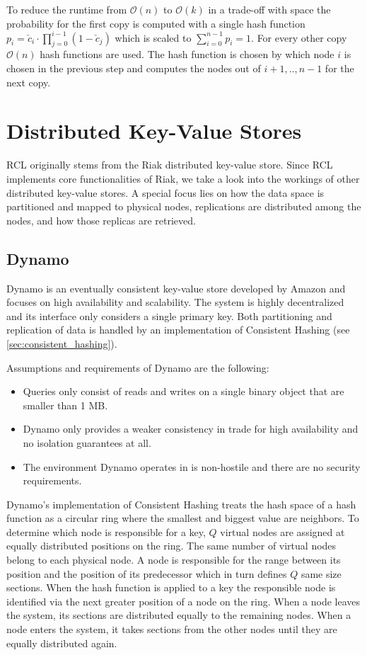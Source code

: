 To reduce the runtime from $\mathcal{O}(n)$ to $\mathcal{O}(k)$  in a trade-off with space the probability for the first copy is computed with a single hash function $p_i = \check c_i\cdot\prod\limits_{j=0}^{i-1}(1-\check c_j)$ which is scaled to $\sum\limits_{i=0}^{n-1}p_i = 1$.
For every other copy $\mathcal{O}(n)$ hash functions are used.
The hash function is chosen by which \gls{node} $i$ is chosen in the previous step and computes the \glspl{node} out of $i+1,..,n-1$ for the next copy.


\section{Distributed Key-Value Stores}
\ac{RCL} originally stems from the Riak distributed key-value store.
Since \ac{RCL} implements core functionalities of Riak, we take a look into the workings of other distributed key-value stores.
A special focus lies on how the data space is partitioned and mapped to physical \glspl{node}, replications are distributed among the \glspl{node}, and how those replicas are retrieved.

\subsection{Dynamo}
\label{sec:dynamo}
Dynamo\cite{DeCandia2007} is an eventually consistent key-value store developed by Amazon and focuses on high availability and scalability.
The system is highly decentralized and its interface only considers a single primary key.
Both partitioning and replication of data is handled by an implementation of Consistent Hashing\cite{Karger1997} (see \cref{sec:consistent_hashing}).

Assumptions and requirements of Dynamo are the following:
\begin{itemize}
\item Queries only consist of reads and writes on a single binary object that are smaller than 1 MB.
\item Dynamo only provides a weaker consistency in trade for high availability and no isolation guarantees at all.
\item The environment Dynamo operates in is non-hostile and there are no security requirements.
\end{itemize}

Dynamo's implementation of Consistent Hashing treats the hash space of a hash function as a circular ring where the smallest and biggest value are neighbors.
To determine which \gls{node} is responsible for a key, $Q$ virtual \glspl{node} are assigned at equally distributed positions on the ring.
The same number of virtual \glspl{node} belong to each physical \gls{node}.
A \gls{node} is responsible for the range between its position and the position of its predecessor which in turn defines $Q$ same size \glspl{section}.
When the hash function is applied to a key the responsible \gls{node} is identified via the next greater position of a \gls{node} on the ring.
When a \gls{node} leaves the system, its \glspl{section} are distributed equally to the remaining nodes.
When a node enters the system, it takes \glspl{section} from the other nodes until they are equally distributed again.

